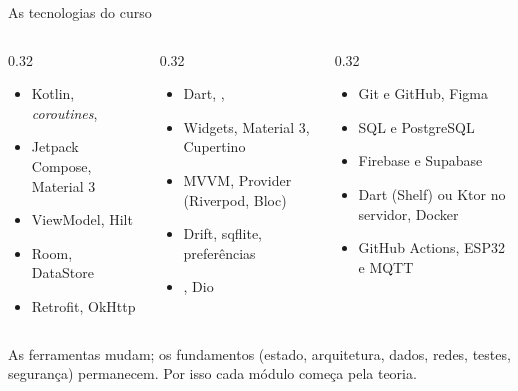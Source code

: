 \documentclass[aspectratio=169,10pt]{beamer}
\begin{document}
\begin{frame}{As tecnologias do curso}
  \begin{columns}[T]
    \begin{column}{0.32\textwidth}
      \begin{conceito}
        \begin{itemize}
          \item Kotlin, \emph{coroutines}, 
          \item Jetpack Compose, Material 3
          \item ViewModel, Hilt
          \item Room, DataStore
          \item Retrofit, OkHttp
        \end{itemize}
      \end{conceito}
    \end{column}
    \begin{column}{0.32\textwidth}
      \begin{conceito}
        \begin{itemize}
          \item Dart, , 
          \item Widgets, Material 3, Cupertino
          \item MVVM, Provider (Riverpod, Bloc)
          \item Drift, sqflite, preferências
          \item {}, Dio
        \end{itemize}
      \end{conceito}
    \end{column}
    \begin{column}{0.32\textwidth}
      \begin{conceito}
        \begin{itemize}
          \item Git e GitHub, Figma
          \item SQL e PostgreSQL
          \item Firebase e Supabase
          \item Dart (Shelf) ou Ktor no servidor, Docker
          \item GitHub Actions, ESP32 e MQTT
        \end{itemize}
      \end{conceito}
    \end{column}
  \end{columns}
  \begin{destaque}
    As ferramentas mudam; os fundamentos (estado, arquitetura, dados, redes, testes, segurança) permanecem. Por isso cada módulo começa pela teoria.
  \end{destaque}
\end{frame}
\end{document}

